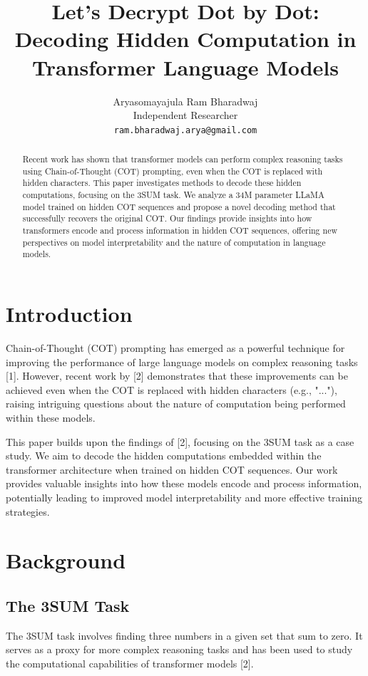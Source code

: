 \documentclass[10pt,a4paper]{article}
\title{Let's Decrypt Dot by Dot: Decoding Hidden Computation in Transformer Language Models}
\author{Aryasomayajula Ram Bharadwaj\\
Independent Researcher\\
\texttt{ram.bharadwaj.arya@gmail.com}}
\begin{document}
\maketitle

\begin{abstract}
Recent work has shown that transformer models can perform complex reasoning tasks using Chain-of-Thought (COT) prompting, even when the COT is replaced with hidden characters. This paper investigates methods to decode these hidden computations, focusing on the 3SUM task. We analyze a 34M parameter LLaMA model trained on hidden COT sequences and propose a novel decoding method that successfully recovers the original COT. Our findings provide insights into how transformers encode and process information in hidden COT sequences, offering new perspectives on model interpretability and the nature of computation in language models.

\end{abstract}

\section{Introduction}
Chain-of-Thought (COT) prompting has emerged as a powerful technique for improving the performance of large language models on complex reasoning tasks [1]. However, recent work by [2] demonstrates that these improvements can be achieved even when the COT is replaced with hidden characters (e.g., "..."), raising intriguing questions about the nature of computation being performed within these models.

This paper builds upon the findings of [2], focusing on the 3SUM task as a case study. We aim to decode the hidden computations embedded within the transformer architecture when trained on hidden COT sequences. Our work provides valuable insights into how these models encode and process information, potentially leading to improved model interpretability and more effective training strategies.

\section{Background}

\subsection{The 3SUM Task}
The 3SUM task involves finding three numbers in a given set that sum to zero. It serves as a proxy for more complex reasoning tasks and has been used to study the computational capabilities of transformer models [2].
\end{document}

